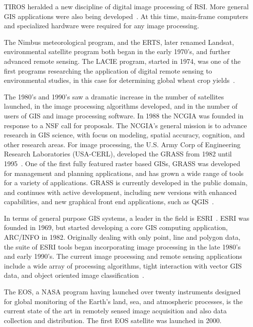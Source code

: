\documentclass{ucdthesis}       %
\begin{document}
\ac{TIROS} heralded a new discipline of digital image processing of
\acf{RSI}.  More general \ac{GIS} applications were also being
developed~\cite{dangermond92what-is, landgrebe86brief-histor}.  At
this time, main-frame computers and specialized hardware were required
for any image processing.

The Nimbus meteorological program, and the \ac{ERTS}, later renamed
Landsat, environmental satellite program both began in the early
1970's, and further advanced remote sensing.  The \ac{LACIE} program,
started in 1974, was one of the first programs researching the
application of digital remote sensing to environmental studies, in
this case for determining global wheat crop
yields~\cite{chhikara78lands-based,swain85advan-inter}.

The 1980's and 1990's saw a dramatic increase in the number of
satellites launched, in the image processing algorithms developed, and
in the number of users of \ac{GIS} and image processing software.  In
1988 the \acf{NCGIA} was founded in response to a \acf{NSF} call for
proposals.  The \ac{NCGIA}'s general mission is to advance research in
\ac{GIS} science, with focus on modeling, spatial accuracy, cognition,
and other research areas.  For image processing, the U.S. Army Corp of
Engineering Research Laboratories (USA-CERL), developed the
\acf{GRASS} from 1982 until 1995~\cite{GRASS_GIS_software,wiki06}.
One of the first fully featured raster based \acp{GIS}, \ac{GRASS} was
developed for management and planning applications, and has grown a
wide range of tools for a variety of applications.  \ac{GRASS} is
currently developed in the public domain, and continues with active
development, including new versions with enhanced capabilities, and
new graphical front end applications, such as
\ac{QGIS}~\cite{wiki06}.

In terms of general purpose \ac{GIS} systems, a leader in the field is
\acf{ESRI}~\cite{wiki06}.  \ac{ESRI} was founded in 1969, but started
developing a core \ac{GIS} computing application, ARC/INFO in 1982.
Originally dealing with only point, line and polygon data, the suite
of \ac{ESRI} tools began incorporating image processing in the late
1980's and early 1990's.  The current image processing and remote
sensing applications include a wide array of processing algorithms,
tight interaction with vector \ac{GIS} data, and object oriented image
classification~\cite{wiki06}.

The \acf{EOS}, a \acs{NASA} program having launched over twenty
instruments designed for global monitoring of the Earth's land, sea,
and atmospheric processes, is the current state of the art in remotely
sensed image acquisition and also data collection and distribution.
The first \ac{EOS} satellite was launched in 2000.
\end{document}
